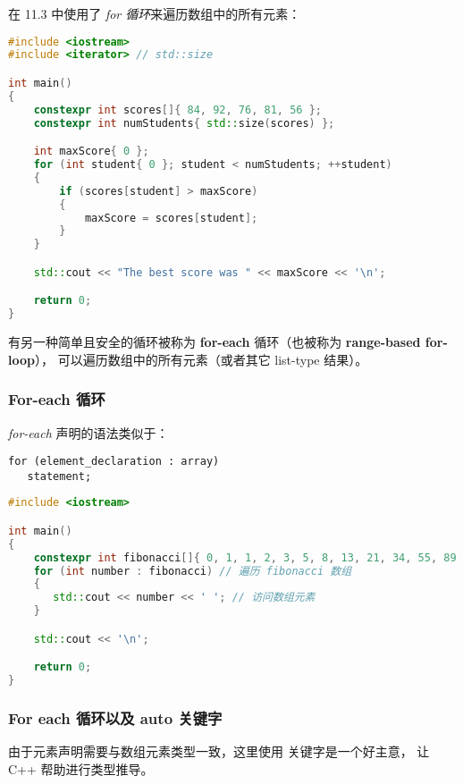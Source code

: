 \documentclass[../../LearnCpp.tex]{subfiles}
\begin{document}

在 11.3 中使用了 \textit{for 循环}来遍历数组中的所有元素：

\begin{lstlisting}[language=C++]
#include <iostream>
#include <iterator> // std::size

int main()
{
    constexpr int scores[]{ 84, 92, 76, 81, 56 };
    constexpr int numStudents{ std::size(scores) };

    int maxScore{ 0 };
    for (int student{ 0 }; student < numStudents; ++student)
    {
        if (scores[student] > maxScore)
        {
            maxScore = scores[student];
        }
    }

    std::cout << "The best score was " << maxScore << '\n';

    return 0;
}
\end{lstlisting}

有另一种简单且安全的循环被称为 \textbf{for-each} 循环（也被称为 \textbf{range-based for-loop}），
可以遍历数组中的所有元素（或者其它 list-type 结果）。

\subsubsection*{For-each 循环}

\textit{for-each} 声明的语法类似于：

\begin{lstlisting}
for (element_declaration : array)
   statement;
\end{lstlisting}

\begin{lstlisting}[language=C++]
#include <iostream>

int main()
{
    constexpr int fibonacci[]{ 0, 1, 1, 2, 3, 5, 8, 13, 21, 34, 55, 89 };
    for (int number : fibonacci) // 遍历 fibonacci 数组
    {
       std::cout << number << ' '; // 访问数组元素
    }

    std::cout << '\n';

    return 0;
}
\end{lstlisting}

\subsubsection*{For each 循环以及 auto 关键字}

由于元素声明需要与数组元素类型一致，这里使用  关键字是一个好主意，
让 C++ 帮助进行类型推导。
\end{document}
